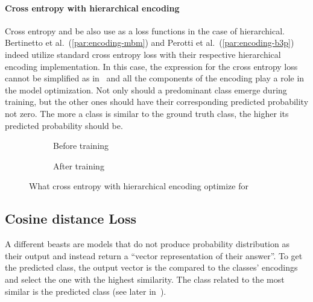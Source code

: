 \paragraph{Cross entropy with hierarchical encoding} Cross entropy and be also
use as a loss functions in the case of hierarchical. Bertinetto et
al.~(\ref{par:encoding-mbm}) and Perotti et al.~(\ref{par:encoding-b3p}) indeed
utilize standard cross entropy loss with their respective hierarchical encoding
implementation. In this case, the expression for the cross entropy loss cannot
be simplified as in~ and all the
components of the encoding play a role in the model optimization. Not only
should a predominant class emerge during training, but the other ones should
have their corresponding predicted probability not zero. The more a class is
similar to the ground truth class, the higher its predicted probability should
be.
\begin{figure}[htbp]
  \centering
  \begin{subfigure}{0.45\textwidth}
    \centering
    \begin{minipage}{\textwidth}
      \resizebox{\linewidth}{!}{}
    \end{minipage}
    \caption{Before training}
    \label{fig:03/xe-hier-before}
  \end{subfigure}
  \begin{subfigure}{0.45\textwidth}
    \centering
    \begin{minipage}{\textwidth}
      \resizebox{\linewidth}{!}{}
    \end{minipage}
    \caption{After training}
    \label{fig:03/xe-hier-after}
  \end{subfigure}
  \caption{What cross entropy with hierarchical encoding optimize for}
\end{figure}

\subsection{Cosine distance Loss}
\label{subsec:cosine-distance-loss}

A different beasts are models that do not produce probability distribution as
their output and instead return a ``vector representation of their answer''. To
get the predicted class, the output vector is the compared to the classes'
encodings and select the one with the highest similarity. The class related to
the most similar is the predicted class (see later in~).

